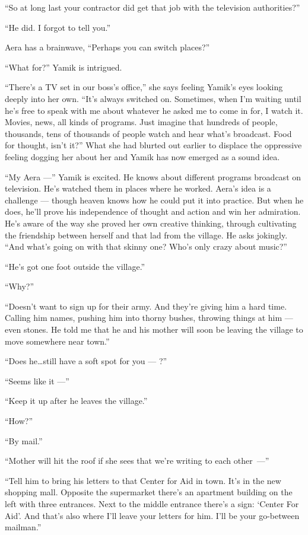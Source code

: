 \documentclass[twoside,11pt,openany]{book}
\begin{document}
``So at long last your contractor did get that job with the television authorities?''

``He did. I forgot to tell you.''

Aera has a brainwave, ``Perhaps you can switch places?''

``What for?'' Yamik is intrigued.

``There's a TV set in our boss's office,'' she says feeling Yamik's eyes looking deeply into
her own.  ``It's always switched on. Sometimes, when I'm waiting until he's free to speak with me about
whatever he asked me to come in for, I watch it. Movies, news, all kinds of programs. Just imagine that hundreds of
people, thousands, tens of thousands of people watch and hear what's broadcast. Food for thought, isn't
it?''  What she had blurted out earlier to displace the oppressive feeling dogging her about her and Yamik
has now emerged as a sound idea.

``My Aera ---'' Yamik is excited. He knows about different programs broadcast on television.
He's watched them in places where he worked. Aera's idea is a challenge --- though heaven knows how he could put it into
practice. But when he does, he'll prove his independence of thought and action and win her admiration. He's aware of
the way she proved her own creative thinking, through cultivating the friendship between herself and
that lad from the village. He asks jokingly. ``And what's going on with that skinny one? Who's only crazy
about music?''

``He's got one foot outside the village.''

``Why?''

``Doesn't want to sign up for their army. And they're giving him a hard time. Calling him names, pushing
him into thorny bushes, throwing things at him --- even stones.  He told me that he and his mother will soon be leaving
the village to move somewhere near town.''

``Does he{\ldots}still have a soft spot for you --- ?''

``Seems like it ---''

``Keep it up after he leaves the village.''

``How?''

``By mail.''

``Mother will hit the roof if she sees that we're writing
to each \hbox{other~---''}

``Tell him to bring his letters to that Center for Aid in town. It's in the new shopping mall.  Opposite
the supermarket there's an apartment building on the left with three entrances. Next to the middle entrance there's a
sign: `Center For Aid'. And that's also where I'll leave your letters for him. I'll be your go-between
mailman.''
\end{document}
